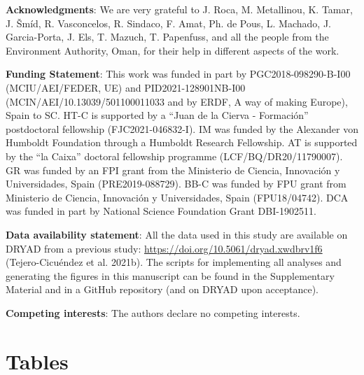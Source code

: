 \documentclass[
  11pt,
]{article}
\begin{document}
\newpage

\hfill\break

\textbf{Acknowledgments}: We are very grateful to J. Roca, M.
Metallinou, K. Tamar, J. Šmíd, R. Vasconcelos, R. Sindaco, F. Amat, Ph.
de Pous, L. Machado, J. Garcia-Porta, J. Els, T. Mazuch, T. Papenfuss,
and all the people from the Environment Authority, Oman, for their help
in different aspects of the work.

\textbf{Funding Statement}: This work was funded in part by
PGC2018-098290-B-I00 (MCIU/AEI/FEDER, UE) and PID2021-128901NB-I00
(MCIN/AEI/10.13039/501100011033 and by ERDF, A way of making Europe),
Spain to SC. HT-C is supported by a ``Juan de la Cierva - Formación''
postdoctoral fellowship (FJC2021-046832-I). IM was funded by the
Alexander von Humboldt Foundation through a Humboldt Research
Fellowship. AT is supported by the ``la Caixa'' doctoral fellowship
programme (LCF/BQ/DR20/11790007). GR was funded by an FPI grant from the
Ministerio de Ciencia, Innovación y Universidades, Spain
(PRE2019-088729). BB-C was funded by FPU grant from Ministerio de
Ciencia, Innovación y Universidades, Spain (FPU18/04742). DCA was funded
in part by National Science Foundation Grant DBI-1902511.

\textbf{Data availability statement}: All the data used in this study
are available on DRYAD from a previous study:
\url{https://doi.org/10.5061/dryad.xwdbrv1f6} (Tejero-Cicuéndez et al.
2021b). The scripts for implementing all analyses and generating the
figures in this manuscript can be found in the Supplementary Material
and in a GitHub repository (and on DRYAD upon acceptance).

\textbf{Competing interests}: The authors declare no competing
interests.

\newpage

\hypertarget{tables}{%
\section{Tables}\label{tables}}
\end{document}
